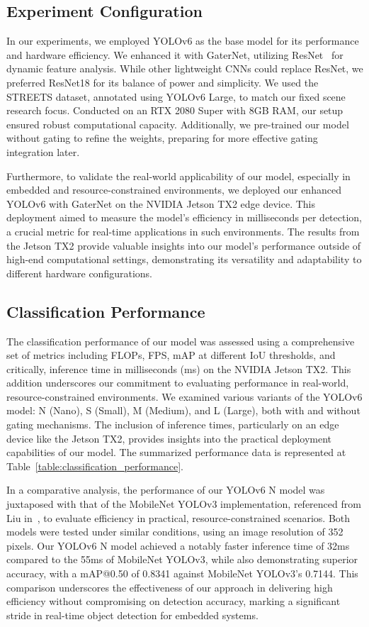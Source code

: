 \documentclass[runningheads]{llncs}
\begin{document}
\subsection{Experiment Configuration}
In our experiments, we employed YOLOv6 as the base model for its performance and hardware efficiency. We enhanced it with GaterNet, utilizing ResNet~\cite{he2016deep} for dynamic feature analysis. While other lightweight CNNs could replace ResNet, we preferred ResNet18 for its balance of power and simplicity. We used the STREETS dataset, annotated using YOLOv6 Large, to match our fixed scene research focus. Conducted on an RTX 2080 Super with 8GB RAM, our setup ensured robust computational capacity. Additionally, we pre-trained our model without gating to refine the weights, preparing for more effective gating integration later.

Furthermore, to validate the real-world applicability of our model, especially in embedded and resource-constrained environments, we deployed our enhanced YOLOv6 with GaterNet on the NVIDIA Jetson TX2 edge device. This deployment aimed to measure the model's efficiency in milliseconds per detection, a crucial metric for real-time applications in such environments. The results from the Jetson TX2 provide valuable insights into our model's performance outside of high-end computational settings, demonstrating its versatility and adaptability to different hardware configurations.

\subsection{Classification Performance}
The classification performance of our model was assessed using a comprehensive set of metrics including FLOPs, FPS, mAP at different IoU thresholds, and critically, inference time in milliseconds (ms) on the NVIDIA Jetson TX2. This addition underscores our commitment to evaluating performance in real-world, resource-constrained environments. We examined various variants of the YOLOv6 model: N (Nano), S (Small), M (Medium), and L (Large), both with and without gating mechanisms. The inclusion of inference times, particularly on an edge device like the Jetson TX2, provides insights into the practical deployment capabilities of our model. The summarized performance data is represented at Table~\ref{table:classification_performance}.

In a comparative analysis, the performance of our YOLOv6 N model was juxtaposed with that of the MobileNet YOLOv3 implementation, referenced from Liu in~\cite{liu2018mobilenet}, to evaluate efficiency in practical, resource-constrained scenarios. Both models were tested under similar conditions, using an image resolution of 352 pixels. Our YOLOv6 N model achieved a notably faster inference time of 32ms compared to the 55ms of MobileNet YOLOv3, while also demonstrating superior accuracy, with a mAP@0.50 of 0.8341 against MobileNet YOLOv3's 0.7144. This comparison underscores the effectiveness of our approach in delivering high efficiency without compromising on detection accuracy, marking a significant stride in real-time object detection for embedded systems.
\end{document}
